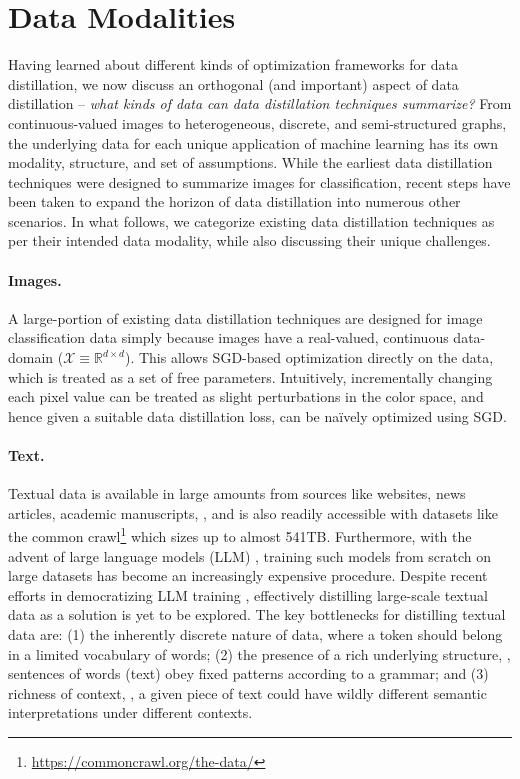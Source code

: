 \documentclass[10pt]{article} %
\begin{document}
\section{Data Modalities} \label{sec:data_modalities}
Having learned about different kinds of optimization frameworks for data distillation, we now discuss an orthogonal (and important) aspect of data distillation -- \emph{what kinds of data can data distillation techniques summarize?} From continuous-valued images to heterogeneous, discrete, and semi-structured graphs, the underlying data for each unique application of machine learning has its own modality, structure, and set of assumptions. While the earliest data distillation techniques were designed to summarize images for classification, recent steps have been taken to expand the horizon of data distillation into numerous other scenarios. In what follows, we categorize existing data distillation techniques as per their intended data modality, while also discussing their unique challenges.

\paragraph{Images.} A large-portion of existing data distillation techniques are designed for image classification data \citep{dd_orig, zhao_dc, zhao_dsa, kip, kip_conv, dm, idc, mtt, cafe, gan_distillation, frepo, rfad, dcc, haba, remember_past, kfs} simply because images have a real-valued, continuous data-domain ($\mathcal{X} \equiv \mathbb{R}^{d \times d}$). This allows SGD-based optimization directly on the data, which is treated as a set of free parameters. Intuitively, incrementally changing each pixel value can be treated as slight perturbations in the color space, and hence given a suitable data distillation loss, can be na\"ively optimized using SGD. 

\paragraph{Text.} Textual data is available in large amounts from sources like websites, news articles, academic manuscripts, \etc, and is also readily accessible with datasets like the common crawl\footnote{\href{https://commoncrawl.org/the-data/}{https://commoncrawl.org/the-data/}} which sizes up to almost 541TB. Furthermore, with the advent of large language models (LLM) \citep{bert, gpt, lamda}, training such models from scratch on large datasets has become an increasingly expensive procedure. Despite recent efforts in democratizing LLM training \citep{cramming, huggingface, bloom}, effectively distilling large-scale textual data as a solution is yet to be explored. The key bottlenecks for distilling textual data are: (1) the inherently discrete nature of data, where a token should belong in a limited vocabulary of words; (2) the presence of a rich underlying structure, \ie, sentences of words (text) obey fixed patterns according to a grammar; and (3) richness of context, \ie, a given piece of text could have wildly different semantic interpretations under different contexts.
\end{document}
